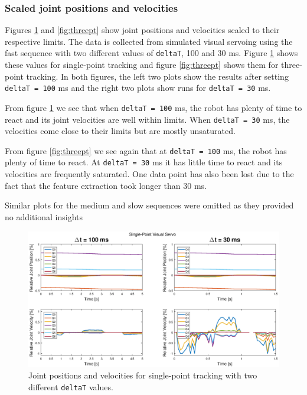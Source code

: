 \documentclass[]{scrartcl}
\begin{document}
\subsubsection*{Scaled joint positions and velocities}
Figures \ref{fig:onept} and \ref{fig:threept} show joint positions and velocities scaled to their respective limits. The data is collected from simulated visual servoing using the fast sequence with two different values of \texttt{deltaT}, 100 and 30 ms. Figure \ref{fig:onept} shows these values for single-point tracking and figure \ref{fig:threept} shows them for three-point tracking. In both figures, the left two plots show the results after setting \texttt{deltaT = 100} ms and the right two plots show runs for \texttt{deltaT = 30} ms.\par
From figure \ref{fig:onept} we see that when \texttt{deltaT = 100} ms, the robot has plenty of time to react and its joint velocities are well within limits. When \texttt{deltaT = 30} ms, the velocities come close to their limits but are mostly unsaturated. \par
From figure \ref{fig:threept} we see again that at \texttt{deltaT = 100} ms, the robot has plenty of time to react. At \texttt{deltaT = 30} ms it has little time to react and its velocities are frequently saturated. One data point has also been lost due to the fact that the feature extraction took longer than 30 ms.\par
Similar plots for the medium and slow sequences were omitted as they provided no additional insights
\begin{figure}
	\centering
	\includegraphics[width=1\linewidth, trim = 75 0 75 0]{fig/onept.eps}
	\caption{Joint positions and velocities for single-point tracking with two different \texttt{deltaT} values.}
	\label{fig:onept}
\end{figure}
\end{document}
